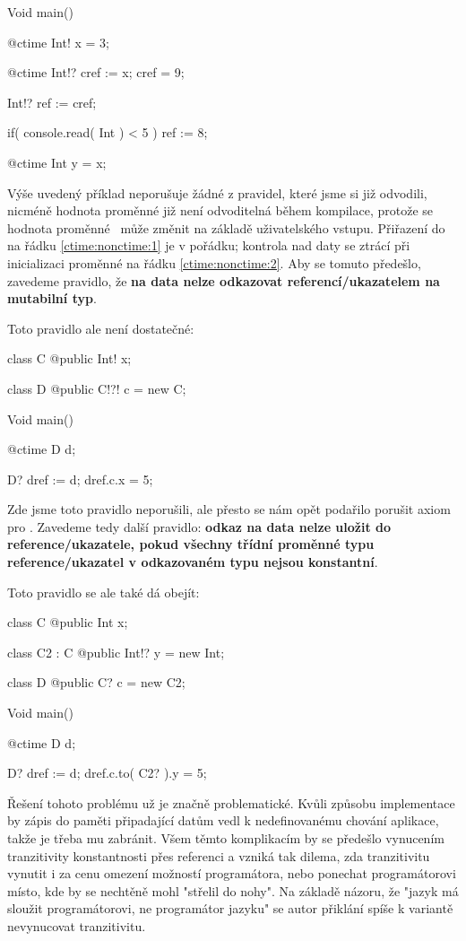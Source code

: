 \begin{code}[\label{ctime:nonctime:3}]
Void main() {
	@ctime Int! x = 3;
	
	@ctime Int!? cref := x;
	cref = 9; $\label{ctime:nonctime:1}$
	
	Int!? ref := cref; $\label{ctime:nonctime:2}$
	
	if( console.read( Int ) < 5 )
		ref := 8;
		
	@ctime Int y = x;
}
\end{code}

Výše uvedený příklad neporušuje žádné z pravidel, které jsme si již odvodili, nicméně hodnota proměnné  již není odvoditelná během kompilace, protože se hodnota proměnné ~může změnit na základě uživatelského vstupu. Přiřazení do  na řádku \ref{ctime:nonctime:1} je v pořádku; kontrola nad daty se ztrácí při inicializaci proměnné  na řádku \ref{ctime:nonctime:2}. Aby se tomuto předešlo, zavedeme pravidlo, že \textbf{na \ctime data nelze odkazovat \nonctime referencí/ukazatelem na mutabilní typ}.

Toto pravidlo ale není dostatečné:
\begin{code}
class C {
	@public Int! x;
}

class D {
	@public C!?! c = new C;
}

Void main() {
	@ctime D d;
	
	D? dref := d;
	dref.c.x = 5;
}
\end{code}

Zde jsme toto pravidlo neporušili, ale přesto se nám opět podařilo porušit axiom pro \ctime. Zavedeme tedy další pravidlo: \textbf{odkaz na \ctime data nelze uložit do \nonctime reference/ukazatele, pokud všechny třídní proměnné typu reference/ukazatel v odkazovaném typu nejsou konstantní}.

Toto pravidlo se ale také dá obejít:
\begin{code}
class C {
	@public Int x;
}

class C2 : C {
	@public Int!? y = new Int;
}

class D {
	@public C? c = new C2;
}

Void main() {
	@ctime D d;
	
	D? dref := d;
	dref.c.to( C2? ).y = 5;
}
\end{code}

Řešení tohoto problému už je značně problematické. Kvůli způsobu implementace by zápis do paměti připadající \ctime datům vedl k nedefinovanému chování aplikace, takže je třeba mu zabránit. Všem těmto komplikacím by se předešlo vynucením tranzitivity konstantnosti přes referenci a vzniká tak dilema, zda tranzitivitu vynutit i za cenu omezení možností programátora, nebo ponechat programátorovi místo, kde by se nechtěně mohl "střelil do nohy". Na základě názoru, že "jazyk má sloužit programátorovi, ne programátor jazyku" se autor přiklání spíše k variantě nevynucovat tranzitivitu.

